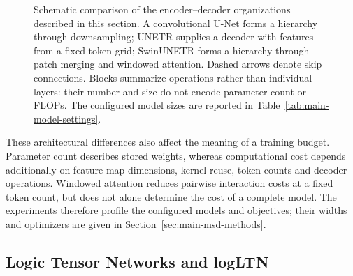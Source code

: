 \documentclass[12pt,a4paper]{article}
\begin{document}
\begin{figure}[htbp]
\caption{Schematic comparison of the encoder--decoder organizations
described in this section. A convolutional U-Net forms a hierarchy through
downsampling; UNETR supplies a decoder with features from a fixed token
grid; SwinUNETR forms a hierarchy through patch merging and windowed
attention. Dashed arrows denote skip connections. Blocks summarize
operations rather than individual layers: their number and size do not
encode parameter count or FLOPs. The configured model sizes are reported
in Table~\ref{tab:main-model-settings}.}
\label{fig:architecture-families}
\end{figure}

These architectural differences also affect the meaning of a training
budget. Parameter count describes stored weights, whereas computational
cost depends additionally on feature-map dimensions, kernel reuse, token
counts and decoder operations. Windowed attention reduces pairwise
interaction costs at a fixed token count, but does not alone determine
the cost of a complete model. The experiments therefore profile the
configured models and objectives; their widths and optimizers are given
in Section~\ref{sec:main-msd-methods}.

\subsection{Logic Tensor Networks and logLTN}\label{sec:ltn-background}
\end{document}
